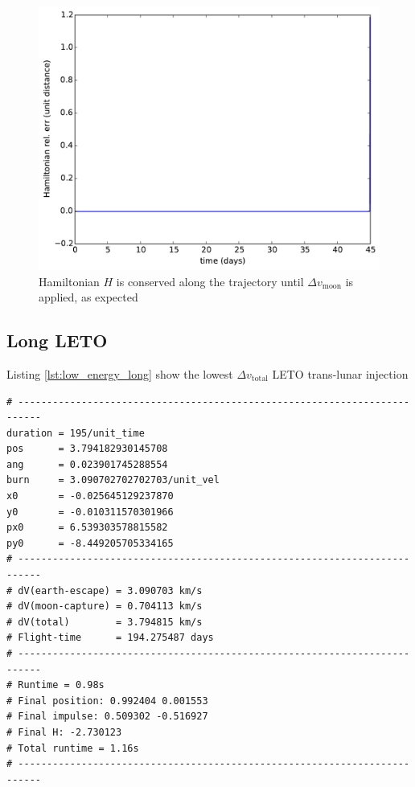 \begin{figure}[ht!]
\centering
\includegraphics[scale=0.35]{fig/low-energy-short/H_low_energy_short.pdf}
\caption{Hamiltonian $H$ is conserved along the trajectory until $\Delta v_{\text{moon}}$ is applied, as expected}
\label{fig:low_energy_short-H}
\end{figure}

\clearpage
\vfill
\subsection{Long LETO}
Listing \ref{lst:low_energy_long} show the lowest $\Delta v_{\text{total}}$ LETO trans-lunar injection 

\begin{adjustwidth*}{0cm}{-0.4cm}
\begin{lstlisting}[caption={Long LETO. \texttt{pos} = angular difference with start angle (here $\theta=-3\pi/4$), \texttt{ang} = angle to velocity vector in Earth parking orbit, \texttt{burn} = $\Delta v_{\text{earth}}$, \texttt{(x0,y0,px0,py0)} are the initial conditions.},label=lst:low_energy_long]
# --------------------------------------------------------------------------
duration = 195/unit_time
pos      = 3.794182930145708
ang      = 0.023901745288554
burn     = 3.090702702702703/unit_vel
x0       = -0.025645129237870
y0       = -0.010311570301966
px0      = 6.539303578815582
py0      = -8.449205705334165
# --------------------------------------------------------------------------
# dV(earth-escape) = 3.090703 km/s
# dV(moon-capture) = 0.704113 km/s
# dV(total)        = 3.794815 km/s
# Flight-time      = 194.275487 days
# --------------------------------------------------------------------------
# Runtime = 0.98s
# Final position: 0.992404 0.001553
# Final impulse: 0.509302 -0.516927
# Final H: -2.730123
# Total runtime = 1.16s
# --------------------------------------------------------------------------
\end{lstlisting}
\end{adjustwidth*}


